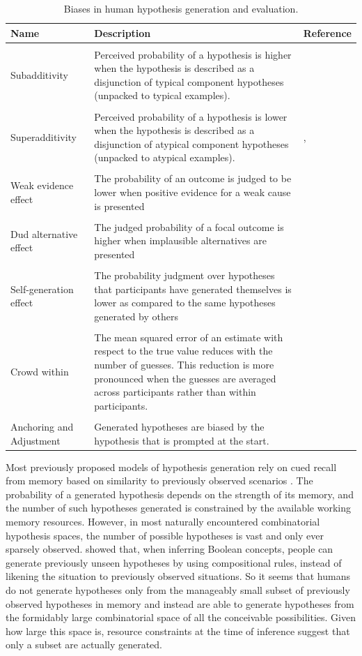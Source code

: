 \begin{table}[htbp]
\centering
\caption{Biases in human hypothesis generation and evaluation.}
\label{tab:biases}
\begin{tabular}{p{}>{\raggedright}p{}>{\raggedright}p{}}
\toprule
\textbf{Name}&\textbf{Description}& \textbf{Reference}\tabularnewline
\midrule \tabularnewline
Subadditivity& Perceived probability of a hypothesis is higher when the hypothesis is described as a disjunction of typical component hypotheses (unpacked to typical examples). & \citet{fox1998belief} \tabularnewline\tabularnewline
Superadditivity& Perceived probability of a hypothesis is lower when the hypothesis is described as a disjunction of atypical component hypotheses (unpacked to atypical examples). & \citet{super}, \citet{hadjichristidis1999opening} \tabularnewline\tabularnewline
Weak evidence effect& The probability of an outcome is judged to be lower when positive evidence for a weak cause is presented & \citet{weak}\tabularnewline\tabularnewline
Dud alternative effect & The judged probability of a focal outcome is higher when implausible alternatives are presented & \citet{dud}\tabularnewline\tabularnewline
Self-generation effect & The probability judgment over hypotheses that participants have generated themselves is lower as compared to the same hypotheses generated by others& \citet{koriat1980,conf} \tabularnewline\tabularnewline
Crowd within & The mean squared error of an estimate with respect to the true value reduces with the number of guesses. This reduction is more pronounced when the guesses are averaged across participants rather than within participants. & \citet{vul08}
\tabularnewline\tabularnewline
Anchoring and Adjustment & Generated hypotheses are biased by the hypothesis that is prompted at the start. & \citet{tversky} \tabularnewline
\bottomrule
\end{tabular}
\end{table}

Most previously proposed models of hypothesis generation rely on cued recall from memory based on similarity to previously observed scenarios \citep[c.f.][]{Thomas2008}. The probability of a generated hypothesis depends on the strength of its memory, and the number of such hypotheses generated is constrained by the available working memory resources. However, in most naturally encountered combinatorial hypothesis spaces, the number of possible hypotheses is vast and only ever sparsely observed. \cite{Goodman2008} showed that, when inferring Boolean concepts, people can generate previously unseen hypotheses by using compositional rules, instead of likening the situation to previously observed situations. So it seems that humans do not generate hypotheses only from the manageably small subset of previously observed hypotheses in memory and instead are able to generate hypotheses from the formidably large combinatorial space of all the conceivable possibilities. Given how large this space is, resource constraints at the time of inference suggest that only a subset are actually generated.

